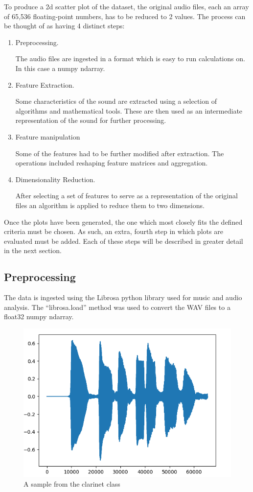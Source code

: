 \documentclass[11pt]{article}
\begin{document}
To produce a 2d scatter plot of the dataset, the original audio files, each an array of 65,536 floating-point numbers, has to be reduced to 2 values.
The process can be thought of as having 4 distinct steps:
\begin{enumerate}
\item Preprocessing.

The audio files are ingested in a format which is easy to run calculations on. In this case a numpy ndarray.
\item Feature Extraction.

Some characteristics of the sound are extracted using a selection of algorithms and mathematical tools. These are then used as an intermediate representation of the sound for further processing.
\item Feature manipulation

Some of the features had to be further modified after extraction. The operations included reshaping feature matrices and aggregation.
\item Dimensionality Reduction.

After selecting a set of features to serve as a representation of the original files an algorithm is applied to reduce them to two dimensions.
\end{enumerate}
Once the plots have been generated, the one which most closely fits the defined criteria must be chosen. As such, an extra, fourth step in which plots are evaluated must be added. Each of these steps will be described in greater detail in the next section.

\subsection{Preprocessing}
\label{sec:org1f10704}

The data is ingested using the Librosa python library \cite{librosa} used for music and audio analysis. The ``librosa.load'' method was used to convert the WAV files to a float32 numpy ndarray.

\begin{figure}[h!]
\centering
\includegraphics[width=.7\textwidth]{./Figures/original_sample.png}
\caption{\label{fig:example-fig}A sample from the clarinet class}
\end{figure}
\end{document}
